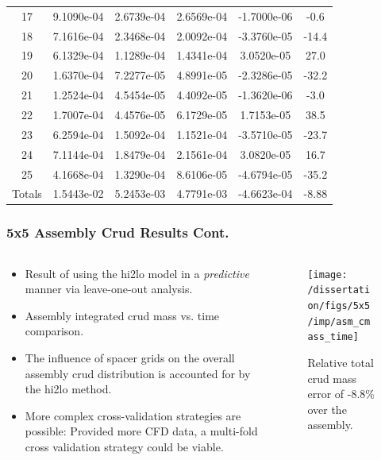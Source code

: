 \documentclass[t, pdftex]{beamer}
\begin{document}
\begin{frame}
\begin{table}[h]
\begin{center}
\begin{tabular}[h]{|c|c|c|c|c|c|}
            17  &9.1090e-04 & 2.6739e-04 & 2.6569e-04 & -1.7000e-06 &  -0.6 \\
            18  &7.1616e-04 & 2.3468e-04 & 2.0092e-04 & -3.3760e-05 &  -14.4 \\
            19  &6.1329e-04 & 1.1289e-04 & 1.4341e-04 & 3.0520e-05 &  27.0 \\ 
            20  &1.6370e-04 & 7.2277e-05 & 4.8991e-05 & -2.3286e-05 &  -32.2 \\
            21  &1.2524e-04 & 4.5454e-05 & 4.4092e-05 & -1.3620e-06 &  -3.0 \\
            22  &1.7007e-04 & 4.4576e-05 & 6.1729e-05 & 1.7153e-05 &  38.5 \\ 
            23  &6.2594e-04 & 1.5092e-04 & 1.1521e-04 & -3.5710e-05 &  -23.7 \\
            24  &7.1144e-04 & 1.8479e-04 & 2.1561e-04 & 3.0820e-05 &  16.7 \\ 
            25  &4.1668e-04 & 1.3290e-04 & 8.6106e-05 & -4.6794e-05 &  -35.2 \\
            \hline \hline
            Totals & 1.5443e-02 & 5.2453e-03 & 4.7791e-03 & -4.6623e-04   & -8.88 \\
            \hline
        \end{tabular}
        \label{tab:loo_crud_bmass}
    \end{center}
\end{table}
\end{frame}

\begin{frame}
\frametitle{5x5 Assembly Crud Results Cont.}
\vspace{-18pt}
\begin{columns}
    \begin{column}{0.5\textwidth}
        \begin{itemize}
            \item Result of using the hi2lo model in a \emph{predictive} manner via leave-one-out analysis.  
            \item Assembly integrated crud mass vs. time comparison.
            \item The influence of spacer grids on the overall assembly crud distribution is accounted for by the hi2lo method.   
            \item More complex cross-validation strategies are possible: Provided more CFD data, a multi-fold cross validation strategy could be viable.
        \end{itemize}
    \end{column}
    \begin{column}{0.5\textwidth}
        \begin{figure}[H]%
            \texttt{[image: /dissertation/figs/5x5/imp/asm\_cmass\_time]}
            \caption{\centering Relative total crud mass error of -8.8\% over the assembly.}
        \end{figure}       
    \end{column}
\end{columns}
\end{frame}
\end{document}
